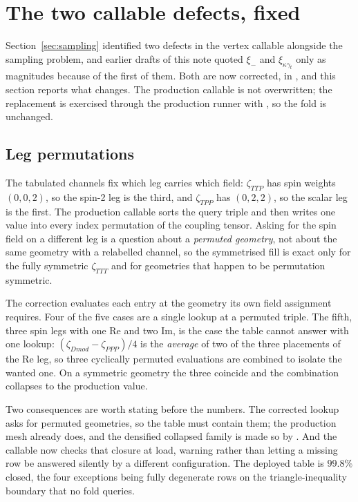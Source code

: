 \section{The two callable defects, fixed}
\label{sec:callablefix}

Section~\ref{sec:sampling} identified two defects in the vertex callable
alongside the sampling problem, and earlier drafts of this note quoted
$\xi_-$ and $\xi_{\kappa\gamma_t}$ only as magnitudes because of the first
of them. Both are now corrected, in
, and this
section reports what changes. The production callable is not overwritten;
the replacement is exercised through the production runner with
, so the fold is unchanged.

\subsection{Leg permutations}

The tabulated channels fix which leg carries which field:
$\zeta_{TTP}$ has spin weights $(0,0,2)$, so the spin-2 leg is the third,
and $\zeta_{TPP}$ has $(0,2,2)$, so the scalar leg is the first. The
production callable sorts the query triple and then writes one value into
every index permutation of the coupling tensor. Asking for the spin field
on a different leg is a question about a \emph{permuted geometry}, not
about the same geometry with a relabelled channel, so the symmetrised fill
is exact only for the fully symmetric $\zeta_{TTT}$ and for geometries that
happen to be permutation symmetric.

The correction evaluates each entry at the geometry its own field
assignment requires. Four of the five cases are a single lookup at a
permuted triple. The fifth, three spin legs with one $\mathrm{Re}$ and two
$\mathrm{Im}$, is the case the table cannot answer with one lookup:
$(\zeta_{Dmod}-\zeta_{PPP})/4$ is the \emph{average} of two of the three
placements of the $\mathrm{Re}$ leg, so three cyclically permuted
evaluations are combined to isolate the wanted one. On a symmetric geometry
the three coincide and the combination collapses to the production value.

Two consequences are worth stating before the numbers. The corrected
lookup asks for permuted geometries, so the table must contain them; the
production mesh already does, and the densified collapsed family is made so
by . And the callable now
checks that closure at load, warning rather than letting a missing row be
answered silently by a different configuration. The deployed table is
$99.8\%$ closed, the four exceptions being fully degenerate rows on the
triangle-inequality boundary that no fold queries.

